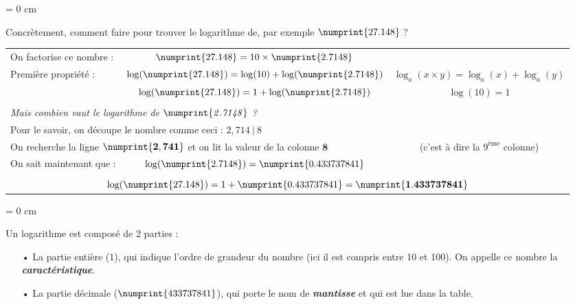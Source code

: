 \documentclass[a4paper, twoside]{article}
\begin{document}
	{ \parindent = 0 cm

	Concrètement, comment faire pour trouver le logarithme de, par exemple $\numprint{27.148}$ ?

	\vspace{0.2 cm}

	\begin{tabular}{lc|c}

	On factorise ce nombre : & $\numprint{27.148} = 10 \times \numprint{2.7148}$ & \\


	Première propriété : & $\log(\numprint{27.148}) = \log(10) + \log(\numprint{2.7148})$ & $ \log_a ( x \times y ) = \log_a (x) + \log_a (y) $\\

	& $\log(\numprint{27.148}) =1 + \log(\numprint{2.7148})$ & $ \log (10) = 1 $\\

	&& \\

	\multicolumn{2}{l|}{ \textit{Mais combien vaut le logarithme de $\mathit{\numprint{2.7148}}$ ?} } &\\


	\multicolumn{2}{l|}{ Pour le savoir, on découpe le nombre comme ceci : $2,714~|~8$} & \\



	\multicolumn{2}{l|}{On recherche la ligne $\mathbf{\numprint{2,741}}$ et on lit la valeur de la colonne $\mathbf{8}$} & (c'est à dire la $9^{\text{ème}}$ colonne)\\


	On sait maintenant que : & $\log (\numprint{2.7148}) = \numprint{0.433 737 841}$ & \\

	\multicolumn{3}{c}{} \\

	\multicolumn{3}{c}{\large $\log(\numprint{27.148}) = 1 + \numprint{0.433 737 841} = \mathbf{\numprint{1.433 737 841}} $}\\

	\end{tabular}
	}

	\vspace{0.3 cm}

	{ \parindent = 0 cm

	Un logarithme est composé de 2 parties :

	\begin{itemize}

		\vspace{0.1 cm}

		\item[•] La partie entière ($1$), qui indique l'ordre de grandeur du nombre (ici il est compris entre 10 et 100). On appelle ce nombre la \textbf{\textit{caractéristique}}.

		\vspace{0.1 cm}

		\item[•] La partie décimale ($\numprint{433 737 841}$), qui porte le nom de \textbf{\textit{mantisse}} et qui est lue dans la table.

	\end{itemize}
	}
\end{document}
